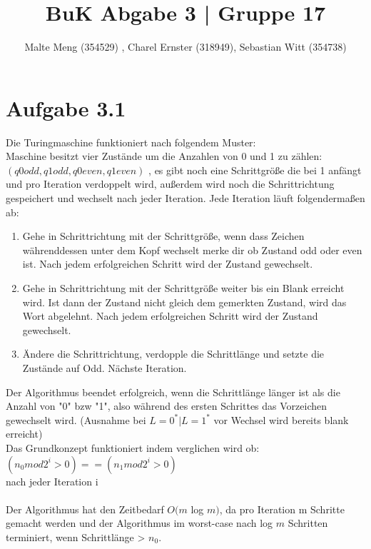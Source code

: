 \documentclass{article}
\title{BuK Abgabe 3 | Gruppe 17}
\author{Malte Meng (354529) , Charel Ernster (318949), Sebastian Witt (354738)}
\begin{document}
	\maketitle 
	\section[a 3.1]{Aufgabe 3.1}
	Die Turingmaschine funktioniert nach folgendem Muster:\\
	Maschine besitzt vier Zustände um die Anzahlen von 0 und 1 zu zählen:\\ $(q0odd,q1odd,q0even,q1even)$ , es gibt noch eine Schrittgröße die bei 1 anfängt und pro Iteration verdoppelt wird, außerdem wird noch die Schrittrichtung gespeichert und wechselt nach jeder Iteration.
	Jede Iteration läuft folgendermaßen ab:
	\begin{enumerate}
		\item Gehe in Schrittrichtung mit der Schrittgröße, wenn dass Zeichen währenddessen unter dem Kopf wechselt merke dir ob Zustand odd oder even ist. Nach jedem erfolgreichen Schritt wird der Zustand gewechselt.
		\item Gehe in Schrittrichtung mit der Schrittgröße weiter bis ein Blank erreicht wird. Ist dann der Zustand nicht gleich dem gemerkten Zustand, wird das Wort abgelehnt. Nach jedem erfolgreichen Schritt wird der Zustand gewechselt.
		\item Ändere die Schrittrichtung, verdopple die Schrittlänge und setzte die Zustände auf Odd. Nächste Iteration.
	\end{enumerate}
	 Der Algorithmus beendet erfolgreich, wenn die Schrittlänge länger ist als die Anzahl von "0" bzw "1", also während des ersten Schrittes das Vorzeichen gewechselt wird.  (Ausnahme bei $L = 0^* | L = 1^*$ vor Wechsel wird bereits blank erreicht)\\
	 Das Grundkonzept funktioniert indem verglichen wird ob:\\ $(n_0 mod 2^i > 0) == (n_1 mod 2^i > 0)$\\ nach jeder Iteration i\\\\
	 Der Algorithmus hat den Zeitbedarf $O(m$ log $m)$, da pro Iteration m Schritte gemacht werden und der Algorithmus im worst-case nach log $m$ Schritten terminiert, wenn Schrittlänge > $n_0$.
\end{document}
